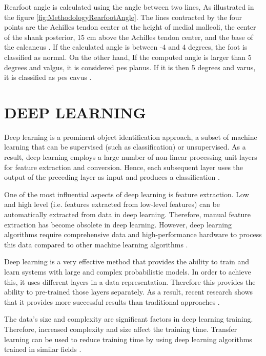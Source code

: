 Rearfoot angle is calculated using the angle between two lines, As illustrated in the figure \ref{fig:MethodologyRearfootAngle}. The lines contracted by the four points are the Achilles tendon center at the height of medial malleoli, the center of the shank posterior, 15 cm above the Achilles tendon center, and the base of the calcaneus \cite{huerta2008relationship}. If the calculated angle is between -4 and 4 degrees, the foot is classified as normal. On the other hand, If the computed angle is larger than 5 degrees and valgus, it is considered pes planus. If it is then 5 degrees and varus, it is classified as pes cavus \cite{jonson1997intraexaminer}.

\section{DEEP LEARNING}

Deep learning is a prominent object identification approach, a subset of machine learning that can be supervised (such as classification) or unsupervised. As a result, deep learning employs a large number of non-linear processing unit layers for feature extraction and conversion. Hence, each subsequent layer uses the output of the preceding layer as input and produces a classification \cite{goodfellow2016deep}.

One of the most influential aspects of deep learning is feature extraction. Low and high level (i.e. features extracted from low-level features)
can be automatically extracted from data in deep learning. Therefore, manual feature extraction has become obsolete in deep learning. However, deep learning algorithms require comprehensive data and high-performance hardware to process this data compared to other machine learning algorithms \cite{lecun2015deep}.

Deep learning is a very effective method that provides the ability to train and learn systems with large and complex probabilistic models. In order to achieve this, it uses different layers in a data representation. Therefore this provides the ability to pre-trained those layers separately. As a result, recent research shows that it provides more successful results than traditional approaches \cite{chen2015net2net, huang2013cross}.

The data's size and complexity are significant factors in deep learning training. Therefore, increased complexity and size affect the training time. Transfer learning can be used to reduce training time by using deep learning algorithms trained in similar fields \cite{goodfellow2016deep}. 

